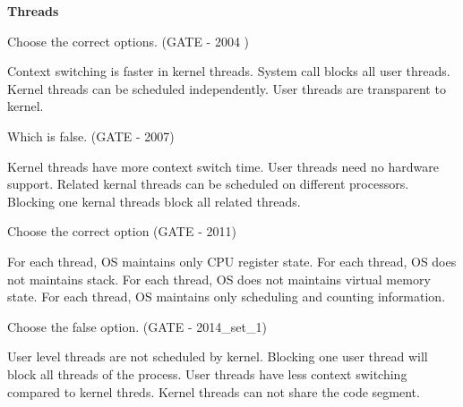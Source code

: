 \centerline{\textbf{ \LARGE Threads}}

  \question Choose the correct options. (GATE - 2004 )

  \begin{choices}
    \choice Context switching is faster in kernel threads.
    \choice System call blocks all user threads.
    \choice Kernel threads can be scheduled independently.
    \choice User threads are transparent to kernel.
  \end{choices}

  \question Which is false. (GATE -  2007)

  \begin{choices}
    \choice Kernel threads have more context switch time.
    \choice User threads need no hardware support.
    \choice Related kernal threads can be scheduled on different processors.
    \choice Blocking one kernal threads block all related threads.
  \end{choices}

  \question  Choose the correct option (GATE - 2011)

  \begin{choices}
    \choice For each thread, OS maintains only CPU register state.
    \choice For each thread, OS does not maintains  stack.
    \choice For each thread, OS does not maintains  virtual memory state.
    \choice For each thread, OS maintains only scheduling and counting information.
  \end{choices}

  \question  Choose the false option. (GATE - 2014\_set\_1)

  \begin{choices}
    \choice User level threads are not scheduled by kernel.
    \choice Blocking one user thread will block all threads of the process.
    \choice User threads have less context switching compared to kernel threds.
    \choice Kernel threads can not share the code segment.
  \end{choices}


\begin{comment}

  \question  (GATE - )

  \begin{choices}
    \choice
    \choice
    \choice
    \choice
  \end{choices}


\end{comment}
